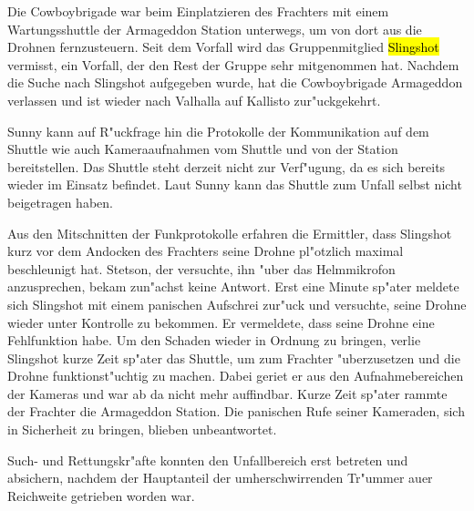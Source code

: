 Die Cowboybrigade war beim Einplatzieren des Frachters mit einem Wartungsshuttle der Armageddon Station unterwegs, um von dort aus die Drohnen fernzusteuern. Seit dem Vorfall wird das Gruppenmitglied \hl{Slingshot} vermisst, ein Vorfall, der den Rest der Gruppe sehr mitgenommen hat. Nachdem die Suche nach Slingshot aufgegeben wurde, hat die Cowboybrigade Armageddon verlassen und ist wieder nach Valhalla auf Kallisto zur"uckgekehrt.

Sunny kann auf R"uckfrage hin die Protokolle der Kommunikation auf dem Shuttle wie auch Kameraaufnahmen vom Shuttle und von der Station bereitstellen. Das Shuttle steht derzeit nicht zur Verf"ugung, da es sich bereits wieder im Einsatz befindet. Laut Sunny kann das Shuttle zum Unfall selbst nicht beigetragen haben.

Aus den Mitschnitten der Funkprotokolle erfahren die Ermittler, dass Slingshot kurz vor dem Andocken des Frachters seine Drohne pl"otzlich maximal beschleunigt hat. Stetson, der versuchte, ihn "uber das Helmmikrofon anzusprechen, bekam zun"achst keine Antwort. Erst eine Minute sp"ater meldete sich Slingshot mit einem panischen Aufschrei zur"uck und versuchte, seine Drohne wieder unter Kontrolle zu bekommen. Er vermeldete, dass seine Drohne eine Fehlfunktion habe. Um den Schaden wieder in Ordnung zu bringen, verlie\3 Slingshot kurze Zeit sp"ater das Shuttle, um zum Frachter "uberzusetzen und die Drohne funktionst"uchtig zu machen. Dabei geriet er aus den Aufnahmebereichen der Kameras und war ab da nicht mehr auffindbar. Kurze Zeit sp"ater rammte der Frachter die Armageddon Station. Die panischen Rufe seiner Kameraden, sich in Sicherheit zu bringen, blieben unbeantwortet.

Such- und Rettungskr"afte konnten den Unfallbereich erst betreten und absichern, nachdem der Hauptanteil der umherschwirrenden Tr"ummer au\3er Reichweite getrieben worden war.

